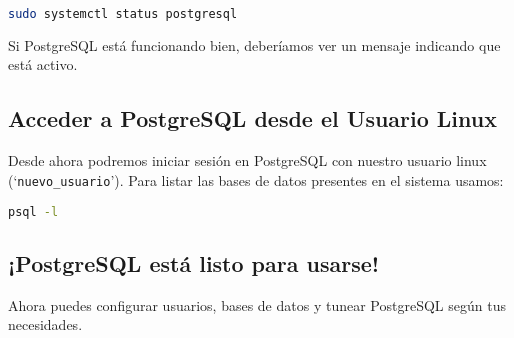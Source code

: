 \documentclass{article}
\begin{document}
\begin{lstlisting}[language=bash]
sudo systemctl status postgresql
\end{lstlisting}

Si PostgreSQL está funcionando bien, deberíamos ver un mensaje indicando que está activo.

\subsection{Acceder a PostgreSQL desde el Usuario Linux}
Desde ahora podremos iniciar sesión en PostgreSQL con nuestro usuario linux (`\texttt{nuevo\_usuario}').  Para listar las bases de datos presentes en el sistema usamos:

\begin{lstlisting}[language=bash]
psql -l
\end{lstlisting}

\subsection{¡PostgreSQL está listo para usarse!}
Ahora puedes configurar usuarios, bases de datos y tunear PostgreSQL según tus necesidades.
\end{document}
